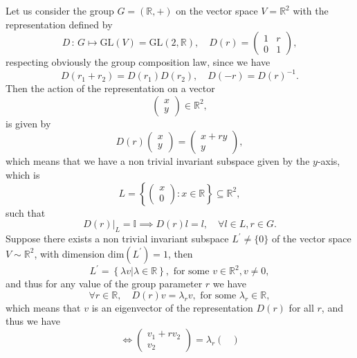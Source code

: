 \begin{example}
    Let us consider the group \(G = (\mathbb{R}, +)\) on the vector space \(V = \mathbb{R}^2\) with the representation defined by
    \[
        D \, : \, G \mapsto \mathrm{GL}(V) = \mathrm{GL}(2, \mathbb{R}), \quad D(r) = \begin{pmatrix}
            1 & r \\
            0 & 1
        \end{pmatrix},
    \]
    respecting obviously the group composition law, since we have
    \[
        D(r_1 + r_2) = D(r_1)D(r_2), \quad D(-r) = D(r)^{-1}.
    \]
    Then the action of the representation on a vector
    \[
        \begin{pmatrix}
            x \\
            y
        \end{pmatrix} \in \mathbb{R}^2,
    \]
    is given by
    \[
        D(r) \begin{pmatrix}
            x \\
            y
        \end{pmatrix} = \begin{pmatrix}
            x + r y \\
            y
        \end{pmatrix},
    \]
    which means that we have a non trivial invariant subspace given by the \(y\)-axis, which is
    \[
        L = \left\{ \begin{pmatrix} x \\ 0 \end{pmatrix} : x \in \mathbb{R} \right\} \subseteq \mathbb{R}^2,
    \]
    such that
    \[
        D(r) \big|_{L} = \mathbb{I} \implies D(r) l = l, \quad \forall l \in L, r \in G.
    \]
    Suppose there exists a non trivial invariant subspace \(L^{\prime} \neq \{0\}\) of the vector space \(V \sim \mathbb{R}^2\), with dimension \(\text{dim}(L^{\prime})=1\), then
    \[
        L^{\prime} = \left\{ \lambda v | \lambda \in \mathbb{R} \right\}, \text{ for some } v \in \mathbb{R}^2, v \neq 0,
    \]
    and thus for any value of the group parameter \(r\) we have
    \[
        \forall r \in \mathbb{R}, \quad D(r) v = \lambda_r v, \text{ for some } \lambda_r \in \mathbb{R},
    \]
    which means that \(v\) is an eigenvector of the representation \(D(r)\) for all \(r\), and thus we have
    \[
        \iff \begin{pmatrix}
            v_1 + r v_2 \\
            v_2
        \end{pmatrix} = \lambda_r \begin{pmatrix}

\end{pmatrix}\]
\end{example}
